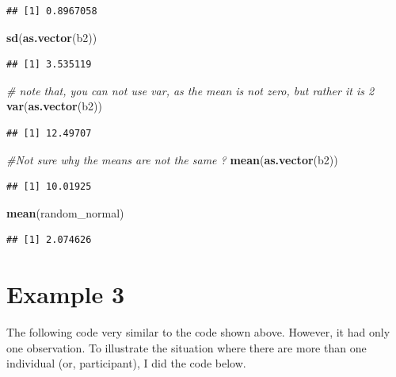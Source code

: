 \documentclass[
]{book}
\newenvironment{Shaded}{\begin{snugshade}}{\end{snugshade}}
\newcommand{\CommentTok}[1]{\textcolor[rgb]{0.56,0.35,0.01}{\textit{#1}}}
\newcommand{\KeywordTok}[1]{\textcolor[rgb]{0.13,0.29,0.53}{\textbf{#1}}}
\newcommand{\NormalTok}[1]{#1}
\begin{document}
\begin{verbatim}
## [1] 0.8967058
\end{verbatim}

\begin{Shaded}
\begin{Highlighting}[]
\KeywordTok{sd}\NormalTok{(}\KeywordTok{as.vector}\NormalTok{(b2))}
\end{Highlighting}
\end{Shaded}

\begin{verbatim}
## [1] 3.535119
\end{verbatim}

\begin{Shaded}
\begin{Highlighting}[]
\CommentTok{# note that, you can not use var, as the mean is not zero, but rather it is 2}
\KeywordTok{var}\NormalTok{(}\KeywordTok{as.vector}\NormalTok{(b2))}
\end{Highlighting}
\end{Shaded}

\begin{verbatim}
## [1] 12.49707
\end{verbatim}

\begin{Shaded}
\begin{Highlighting}[]
\CommentTok{#Not sure why the means are not the same ?}
\KeywordTok{mean}\NormalTok{(}\KeywordTok{as.vector}\NormalTok{(b2))}
\end{Highlighting}
\end{Shaded}

\begin{verbatim}
## [1] 10.01925
\end{verbatim}

\begin{Shaded}
\begin{Highlighting}[]
\KeywordTok{mean}\NormalTok{(random_normal)}
\end{Highlighting}
\end{Shaded}

\begin{verbatim}
## [1] 2.074626
\end{verbatim}

\hypertarget{example-3}{%
\section{Example 3}\label{example-3}}

The following code very similar to the code shown above. However, it had only one observation. To illustrate the situation where there are more than one individual (or, participant), I did the code below.
\end{document}

